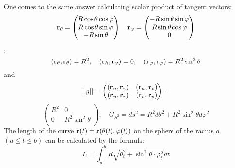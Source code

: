 \documentclass[12pt]{article}
\theoremstyle{theorem}
\numberwithin{equation}{section}
\begin{document}
One comes to the same answer calculating scalar product of tangent vectors:
  \begin{equation*}\label{c}
  {\bf r}_\theta=\begin{pmatrix}
        R\cos\theta\cos\varphi\\
        R\cos\theta\sin\varphi\\
        -R\sin\theta\\
   \end{pmatrix}
\quad
  {\bf r}_\varphi=\begin{pmatrix}
        -R\sin\theta\sin\varphi\\
        R\sin\theta\cos\varphi\\
          0\\
   \end{pmatrix}
 \end{equation*},
            $$
     ({\bf r}_\theta,{\bf r}_\theta)=R^2,\quad
     ({\bf r}_h,{\bf r}_\varphi)=0,\quad
     ({\bf r}_\varphi,{\bf r}_\varphi)=R^2\sin^2\theta
            $$
and
\begin{equation*}\label{formula forfirstform3*}
   ||g||=
   \begin{pmatrix}
   ({\bf r}_u,{\bf r}_u) & ({\bf r}_u,{\bf r}_v) \\
   ({\bf r}_u,{\bf r}_v) & ({\bf r}_v,{\bf r}_v) \\
   \end{pmatrix}=
\end{equation*}
\begin{equation*}\label{formula forfirstformsphere}
   \begin{pmatrix}
   R^2 & 0 \\
   0&  R^2\sin^2\theta \\
   \end{pmatrix}, \quad
   G_{S^2}=ds^2=R^2d\theta^2+R^2\sin^2\theta d\varphi^2
\end{equation*}
  The length of the curve ${\bf r}(t)={\bf r} (\theta(t), \varphi(t))$ on the
  sphere of the radius $a$
    $(a\leq t\leq b)$
  can be calculated by the formula:
               \begin{equation}
             L=\int_a^b
             R\sqrt{\theta_t^2+\sin^2\theta\cdot \varphi_t^2}dt
               \end{equation}
\end{document}
